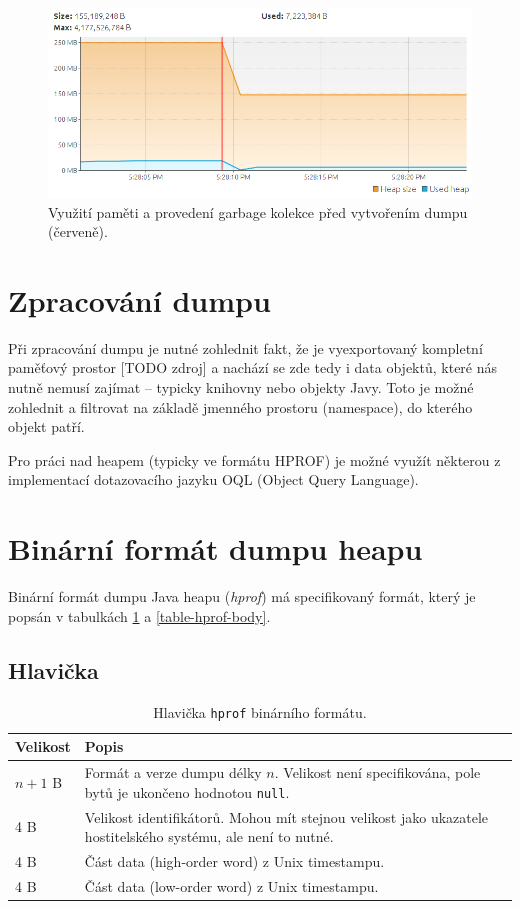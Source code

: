 \begin{figure}[h]
	\centering
	\includegraphics[scale=0.5]{obrazky/heapdump-performed.png}
	\caption{Využití paměti a provedení garbage kolekce před vytvořením dumpu (červeně).}
	\label{obr1}
\end{figure}

\section{Zpracování dumpu}
Při zpracování dumpu je nutné zohlednit fakt, že je vyexportovaný kompletní paměťový prostor [TODO zdroj] a nachází se zde tedy i data objektů, které nás nutně nemusí zajímat – typicky knihovny nebo objekty Javy. Toto je možné zohlednit a filtrovat na základě jmenného prostoru (namespace), do kterého objekt patří.

Pro práci nad heapem  (typicky ve formátu HPROF) je možné využít některou z implementací dotazovacího jazyku OQL (Object Query Language).

\section{Binární formát dumpu heapu}
Binární formát dumpu Java heapu (\textit{hprof}) má specifikovaný formát, který je popsán v tabulkách \ref{table-hprof-header} a \ref{table-hprof-body}.

\subsection{Hlavička}
\begin{table}[ht!]
    \begin{tabularx}{\textwidth}{|l|X|}
        \hline
    \textbf{Velikost} & \textbf{Popis} \\ \hline \hline
    $n + 1$ B & Formát a verze dumpu délky $n$. Velikost není specifikována, pole bytů je ukončeno hodnotou \texttt{null}. \\
    4 B & Velikost identifikátorů. Mohou mít stejnou velikost jako ukazatele hostitelského systému, ale není to nutné. \\
    4 B & Část data (high-order word) z Unix timestampu. \\
    4 B & Část data (low-order word) z Unix timestampu.  \\ \hline                                                                   
    \end{tabularx}
    \caption{Hlavička \texttt{hprof} binárního formátu.}
    \label{table-hprof-header}
\end{table}

